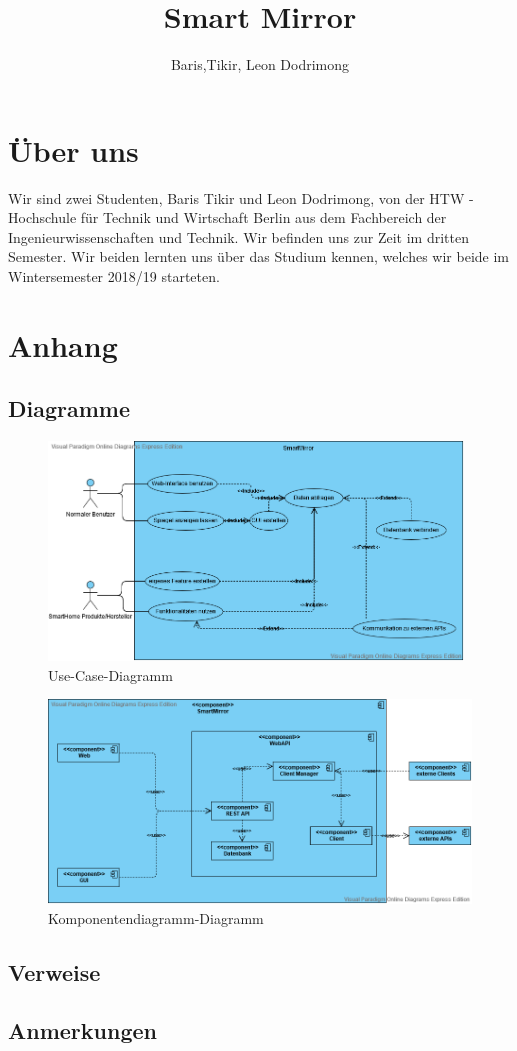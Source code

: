 \documentclass[a4paper,11pt]{article}
\author{Baris,Tikir, Leon Dodrimong}
\title{Smart Mirror}
\begin{document}
\maketitle
\newpage
\tableofcontents
\newpage












\section{Über uns}
Wir sind zwei Studenten, Baris Tikir und Leon Dodrimong, von der HTW - Hochschule für Technik und Wirtschaft Berlin aus dem Fachbereich der Ingenieurwissenschaften und Technik. Wir befinden uns zur Zeit im dritten Semester. Wir beiden lernten uns über das Studium kennen, welches wir beide im Wintersemester 2018/19 starteten.

\newpage{}
\section{Anhang}
\subsection{Diagramme}
\label{UseCase}
\begin{figure}[h]
\centering
\includegraphics[width=110mm]{pictures/Use-Case-Diagramm.png}
\caption{Use-Case-Diagramm}
\end{figure}
\label{Komponentendiagramm}
\begin{figure}[h]
\centering
\includegraphics[width=130mm]{pictures/KomponentenDiagramm.png}
\caption{Komponentendiagramm-Diagramm}
\end{figure}
\newpage
\subsection{Verweise}
\subsection{Anmerkungen}
\end{document}

